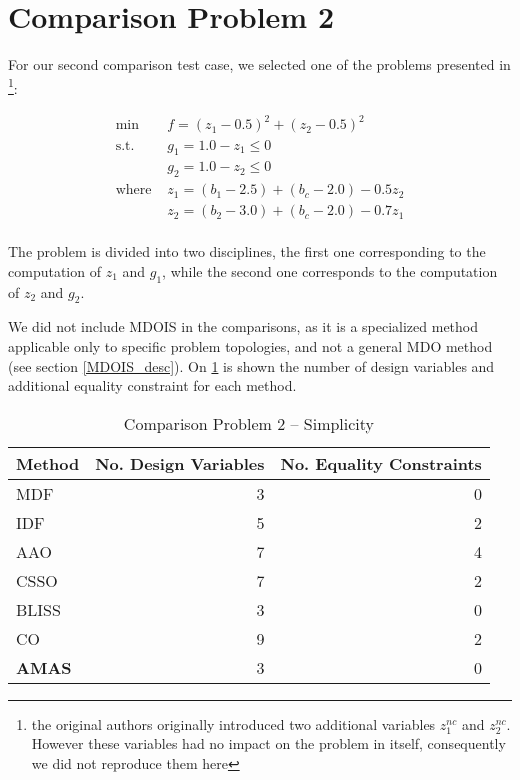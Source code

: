 \section{Comparison Problem 2}

For our second comparison test case, we selected one of the problems presented in  \cite{Yi2008}\footnote{the original authors originally introduced two additional variables $z_1^{nc}$ and $z_2^{nc}$. However these variables had no impact on the problem in itself, consequently we did not reproduce them here}:

\begin{align*}
\text{min }		&	f =(z_1 - 0.5)^2  + (z_2 - 0.5)^2\\
\text{s.t. }			&	g_1 = 1.0 -  z_1 \leq 0\\ 
							&	g_2 = 1.0 -  z_2 \leq 0\\ 
\text{where }	& z_1 = (b_1 - 2.5) + (b_c -2.0) -0.5z_2\\
							& z_2 = (b_2 - 3.0) + (b_c -2.0) -0.7z_1\\
\end{align*}

The problem is divided into two disciplines, the first one corresponding to the computation of $z_1$ and $g_1$, while the second one corresponds to the computation of $z_2$ and $g_2$.

We did not include MDOIS in the comparisons, as it is a specialized method applicable only to specific problem topologies, and not a general MDO method (see section \ref{MDOIS_desc}). On \tablename{} \ref{bench2_simplicity} is shown the number of design variables and additional equality constraint for each method.

\begin{table}
\caption{Comparison Problem 2 -- Simplicity}\label{bench2_simplicity}
\centering
\begin{tabular}{lrr}
\toprule
Method & No. Design Variables & No. Equality Constraints\\
\midrule
MDF					&	3	&	0 \\
IDF						&	5	&	2 \\
AAO					& 7	&	4 \\
CSSO					&	7	&	2 \\
BLISS					&	3	&	0	\\
CO						&	9	&	2	\\
\textbf{AMAS}&	3	&	0	\\
\bottomrule
\end{tabular}
\end{table}

